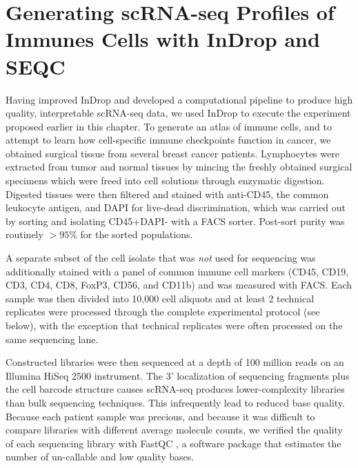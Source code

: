 
\section{Generating scRNA-seq Profiles of Immunes Cells with InDrop and SEQC} %

Having improved InDrop and developed a computational pipeline to produce high quality, interpretable scRNA-seq data, we used InDrop to execute the experiment proposed earlier in this chapter. 
To generate an atlas of immune cells, and to attempt to learn how cell-specific immune checkpoints function in cancer, we obtained surgical tissue from several breast cancer patients. 
Lymphocytes were extracted from tumor and normal tissues by mincing the freshly obtained surgical specimens which were freed into cell solutions through enzymatic digestion. 
Digested tissues were then filtered and stained with anti-CD45, the common leukocyte antigen, and DAPI for live-dead discrimination, which was carried out by sorting and isolating CD45+DAPI- with a FACS sorter.  
Post-sort purity was routinely $>95\%$ for the sorted populations.

A separate subset of the cell isolate that was \textit{not} used for sequencing was additionally stained with a panel of common immune cell markers (CD45, CD19, CD3, CD4, CD8, FoxP3, CD56, and CD11b) and was measured with FACS\@. 
Each sample was then divided into 10,000 cell aliquots and at least 2 technical replicates were processed through the complete experimental protocol (see below), with the exception that technical replicates were often processed on the same sequencing lane. 

Constructed libraries were then sequenced at a depth of 100 million reads on an Illumina HiSeq 2500 instrument.
The 3' localization of sequencing fragments plus the cell barcode structure causes scRNA-seq produces lower-complexity libraries than bulk sequencing techniques. 
This infrequently lead to reduced base quality. 
Because each patient sample was precious, and because it was difficult to compare libraries with different average molecule counts, we verified the quality of each sequencing library with FastQC \citep{Andrews2010}, a software package that estimates the number of un-callable and low quality bases.


